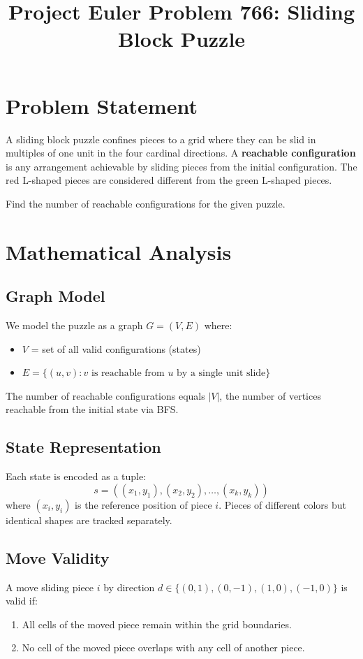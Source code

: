 \documentclass[12pt]{article}
\title{Project Euler Problem 766: Sliding Block Puzzle}
\author{}
\date{}
\begin{document}
\maketitle

\section{Problem Statement}
A sliding block puzzle confines pieces to a grid where they can be slid in multiples of one unit in the four cardinal directions. A \textbf{reachable configuration} is any arrangement achievable by sliding pieces from the initial configuration. The red L-shaped pieces are considered different from the green L-shaped pieces.

Find the number of reachable configurations for the given puzzle.

\section{Mathematical Analysis}

\subsection{Graph Model}
We model the puzzle as a graph $G = (V, E)$ where:
\begin{itemize}
    \item $V$ = set of all valid configurations (states)
    \item $E = \{(u, v) : v \text{ is reachable from } u \text{ by a single unit slide}\}$
\end{itemize}

The number of reachable configurations equals $|V|$, the number of vertices reachable from the initial state via BFS.

\subsection{State Representation}
Each state is encoded as a tuple:
\[
    s = ((x_1, y_1), (x_2, y_2), \ldots, (x_k, y_k))
\]
where $(x_i, y_i)$ is the reference position of piece $i$. Pieces of different colors but identical shapes are tracked separately.

\subsection{Move Validity}
A move sliding piece $i$ by direction $d \in \{(0,1),(0,-1),(1,0),(-1,0)\}$ is valid if:
\begin{enumerate}
    \item All cells of the moved piece remain within the grid boundaries.
    \item No cell of the moved piece overlaps with any cell of another piece.
\end{enumerate}
\end{document}
